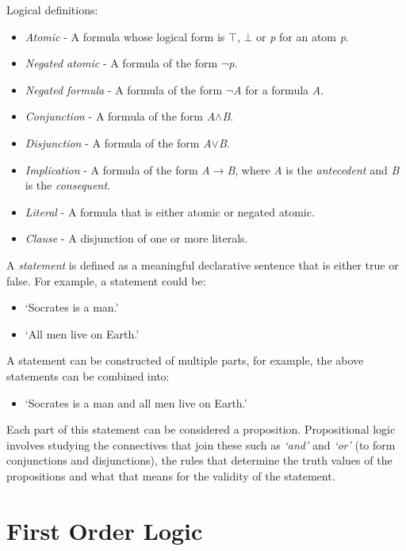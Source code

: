 \documentclass{report}
\begin{document}
Logical definitions:

\begin{itemize}
\item \emph{Atomic} - A formula whose logical form is $\top$, $\bot$ or \textit{p} for an atom \textit{p}.
\item \emph{Negated atomic} - A formula of the form $\neg$\textit{p}.
\item \emph{Negated formula} - A formula of the form $\neg$\textit{A} for a formula \textit{A}.
\item \emph{Conjunction} - A formula of the form \textit{A}$\land$\textit{B}.
\item \emph{Disjunction} - A formula of the form \textit{A}$\lor$\textit{B}.
\item \emph{Implication} - A formula of the form \textit{A}$\to$\textit{B}, where \textit{A} is the \emph{antecedent} and \textit{B} is the \emph{consequent}.
\item \emph{Literal} - A formula that is either atomic or negated atomic.
\item \emph{Clause} - A disjunction of one or more literals.
\end{itemize}

A \textit{statement} is defined as a meaningful declarative sentence that is either true or false. For example, a statement could be: 

\begin{itemize}
\item `Socrates is a man.'
\item `All men live on Earth.'
\end{itemize}
A statement can be constructed of multiple parts, for example, the above statements can be combined into:

\begin{itemize}
\item `Socrates is a man and all men live on Earth.'
\end{itemize}
Each part of this statement can be considered a proposition. Propositional logic involves studying the connectives that join these such as \textit{`and'} and \textit{`or'} (to form conjunctions and disjunctions), the rules that determine the truth values of the propositions and what that means for the validity of the statement.

\section{First Order Logic}
\end{document}
